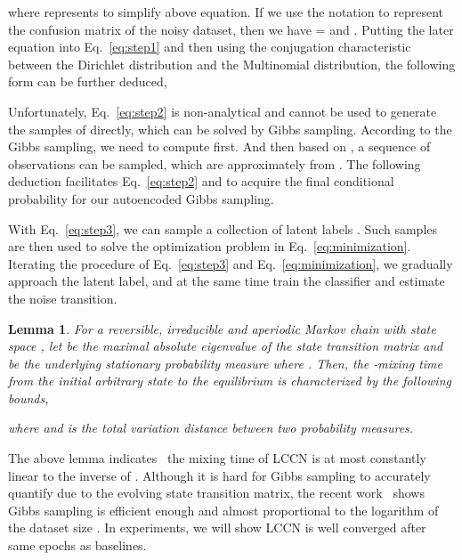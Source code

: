 \documentclass[journal]{IEEEtran}
\newtheorem{lemma}[theorem]{Lemma}
\begin{document}
where  represents  to simplify above equation.
If we use the notation  to represent the confusion matrix of the noisy dataset, then we have = and . Putting the later equation into Eq.~\eqref{eq:step1} and then using the conjugation characteristic between the Dirichlet distribution and the Multinomial distribution, the following form can be further deduced,

Unfortunately, Eq.~\eqref{eq:step2} is non-analytical and cannot be used to generate the samples of  directly, which can be solved by Gibbs sampling. According to the Gibbs sampling, we need to compute  first. And then based on , a sequence of observations can be sampled, which are approximately from . The following deduction facilitates Eq.~\eqref{eq:step2} and  to acquire the final conditional probability for our autoencoded Gibbs sampling.

With Eq.~\eqref{eq:step3}, we can sample a collection of latent labels . Such samples are then used to solve the optimization problem in Eq.~\eqref{eq:minimization}. Iterating the procedure of Eq.~\eqref{eq:step3} and Eq.~\eqref{eq:minimization}, we gradually approach the latent label, and at the same time train the classifier and estimate the noise transition. 
  
\begin{lemma}
For a reversible, irreducible and aperiodic Markov chain with state space , let  be the maximal absolute eigenvalue of the state transition matrix and  be the underlying stationary probability measure where . Then, the -mixing time from the initial arbitrary state to the equilibrium is characterized by the following bounds,

where  and  is the total variation distance between two probability measures.
\end{lemma}
The above lemma indicates~\cite{levin2017markov} the mixing time of LCCN is at most constantly linear to the inverse of . Although it is hard for Gibbs sampling to accurately quantify  due to the evolving state transition matrix, the recent work~\cite{johanmixing} shows Gibbs sampling is efficient enough and almost proportional to the logarithm of the dataset size . In experiments, we will show LCCN is well converged after same epochs as baselines. 
\end{document}
